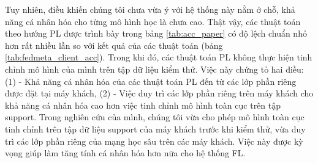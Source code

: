 Tuy nhiên, điều khiến chúng tôi chưa vừa ý với hệ thống này nằm ở chỗ, khả năng cá nhân hóa cho từng mô hình học là chưa cao. Thật vậy, các thuật toán theo hướng PL được trình bày trong bảng \ref{tab:acc_paper} có độ lệch chuẩn nhỏ hơn rất nhiều lần so với kết quả của các thuật toán  (bảng \ref{tab:fedmeta_client_acc}). Trong khi đó, các thuật toán PL không thực hiện tinh chỉnh mô hình của mình trên tập dữ liệu kiểm thử. Việc này chứng tỏ hai điều: (1) - Khả năng cá nhân hóa của các thuật toán PL đến từ các lớp phần riêng được đặt tại máy khách, (2) - Việc duy trì các lớp phần riêng trên máy khách cho khả năng cá nhân hóa cao hơn việc tinh chỉnh mô hình toàn cục trên tập support. Trong nghiên cứu của mình, chúng tôi vừa cho phép mô hình toàn cục tinh chỉnh trên tập dữ liệu support của máy khách trước khi kiểm thử, vừa duy trì các lớp phần riêng của mạng học sâu trên các máy khách. Việc này được kỳ vọng giúp làm tăng tính cá nhân hóa hơn nữa cho hệ thống FL.

\begin{table}[H]
    \centering
    \caption{Bảng độ chính xác (\%) của thuật toán FedAvg và các thuật toán FedMeta tính trên máy khách (dữ liệu Non-IID)}
    \label{tab:fedmeta_client_acc}
\end{table}

